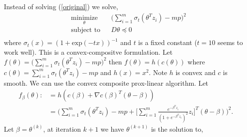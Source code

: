 \documentclass[12pt]{article}
\begin{document}
Instead of solving (\ref{original}) we solve,
\begin{equation}
\begin{aligned}
& \underset{\theta}{\text{minimize}}
& & \big( \sum \limits_{i=1}^{m} \sigma_{t}(\theta^{T}z_{i}) - mp \big)^{2} \\
& \text{subject to}
& & D\theta \preceq 0 \\
\end{aligned}
\end{equation}
where $\sigma_{t}(x) = (1+\textrm{exp}(-tx))^{-1}$ and $t$ is a fixed constant ($t=10$ seems to work well). This is a convex-compositve formulation. Let $f(\theta) = \big( \sum \limits_{i=1}^{m} \sigma_{t}(\theta^{T}z_{i}) - mp \big)^{2}$ then $f(\theta) = h(c(\theta))$ where $c(\theta) = \sum \limits_{i=1}^{m} \sigma_{t}(\theta^{T}z_{i}) - mp $ and $h(x) = x^{2}$. Note $h$ is convex and $c$ is smooth. We can use the convex composite prox-linear algorithm. Let 
\begin{align*}
\hat{f}_{\beta}(\theta) :&= h(c(\beta) + \nabla c(\beta)^{T}(\theta - \beta))  \\
& = \bigg( \sum \limits_{i=1}^{m} \sigma_{t}(\theta^{T}z_{i}) - mp + \bigg[ \sum \limits_{i=1}^{m} \frac{e^{-\beta^{T}z_{i}}}{(1+e^{-\beta^{T}z_{i}})^{2}}z_{i} \bigg]^{T} (\theta - \beta) \bigg)^{2}.
\end{align*}
Let $\beta =\theta^{(k)}$, at iteration $k+1$ we have $\theta^{(k+1)}$ is the solution to,
\end{document}
